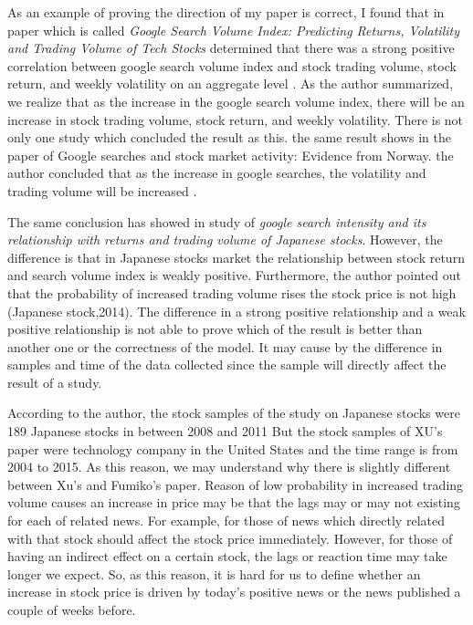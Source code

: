 \documentclass[12pt,english]{article}
\begin{document}
\newline
As an example of proving the direction of my paper is correct, I found that in paper which is called \textit{Google Search Volume Index: Predicting Returns, Volatility and Trading Volume of Tech Stocks} determined that there was a strong positive correlation between google search volume index and stock trading volume, stock return, and weekly volatility on an aggregate level \citep{xu2015}. As the author summarized, we realize that as the increase in the google search volume index, there will be an increase in stock trading volume, stock return, and weekly volatility. There is not only one study which concluded the result as this. the same result shows in the paper of Google searches and stock market activity: Evidence from Norway. the author concluded that as the increase in google searches, the volatility and trading volume will be increased \citep{kim2019google}.
\newline

\newline
The same conclusion has showed in study of \textit{google search intensity and its relationship with returns and trading volume of Japanese stocks}. However, the difference is that in Japanese stocks market the relationship between stock return and search volume index is weakly positive. Furthermore, the author pointed out that the probability of increased trading volume rises the stock price is not high \cite{takeda2014google}(Japanese stock,2014).  The difference in a strong positive relationship and a weak positive relationship is not able to prove which of the result is better than another one or the correctness of the model. It may cause by the difference in samples and time of the data collected since the sample will directly affect the result of a study.
\newline

\newline
According to the author, the stock samples of the study on Japanese stocks were 189 Japanese stocks in between 2008 and 2011 But the stock samples of XU’s paper were technology company in the United States and the time range is from 2004 to 2015. As this reason, we may understand why there is slightly different between Xu’s and Fumiko’s paper. Reason of low probability in increased trading volume causes an increase in price may be that the lags may or may not existing for each of related news. For example, for those of news which directly related with that stock should affect the stock price immediately. However, for those of having an indirect effect on a certain stock, the lags or reaction time may take longer we expect. So, as this reason, it is hard for us to define whether an increase in stock price is driven by today’s positive news or the news published a couple of weeks before.
\newline
\end{document}
